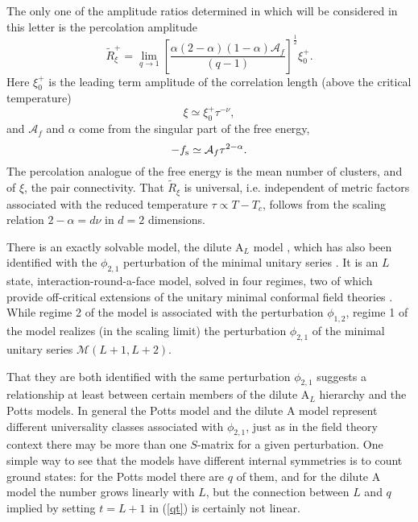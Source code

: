 \documentclass[a4paper,a4paper]{article}
\begin{document}
The only one of the amplitude ratios determined in \cite{dc}
which will be considered in this letter is the percolation
amplitude \cite{PHA, dc}
\begin{equation}
\tilde{R}_{\xi}^{+}=
\lim_{q\to 1}\left[\frac{\alpha(2-\alpha)(1-\alpha) \mathcal{A}_f}{(q-1)}
\right]^{\frac{1}{2}}\xi_{0}^{+}. \label{Imp}
\end{equation}
Here 
$\xi_0^{+}$ is the leading term amplitude of the correlation length
(above the critical temperature)
\begin{equation*}
\xi \simeq \xi_0^{+} \tau^{-\nu},
\end{equation*}
and $\mathcal{A}_f$ and $\alpha$ come from the singular 
part of the free energy, 
\begin{equation*}
-f_{\rm s} \simeq {\mathcal
A}_f \tau^{2-\alpha}.
\end{equation*}
The percolation analogue of the free energy is the mean number of clusters, 
and of
$\xi$, the pair connectivity.
That $\tilde{R}_{\xi}$ is universal, i.e. independent of metric factors 
associated
with the reduced temperature $\tau \propto T-T_c$,  follows
from the scaling relation $2-\alpha =d \nu$ in $d=2$ dimensions. 


There is an exactly solvable model, the dilute A$_L$ model
\cite{WNS}, which has also been identified with the
$\phi_{2,1}$ perturbation of the minimal unitary series \cite{WPSN}.
It is an $L$ state, 
interaction-round-a-face model, solved in four regimes,
two of which provide off-critical extensions of the unitary minimal conformal
field theories \cite{WPSN}.  While regime 2 of the model is associated with
the perturbation $\phi_{1,2}$, regime 1 of the model realizes
(in the scaling limit) the perturbation $\phi_{2,1}$ of the minimal
unitary series $\mathcal{M}(L+1,L+2)$.


That they are both identified with the same perturbation $\phi_{2,1}$ 
suggests a relationship at least
between certain members of the dilute A$_L$ hierarchy and the Potts models. 
In general the Potts model and the dilute A model represent 
different universality classes associated with $\phi_{2,1}$, just
as in the field theory context there may be more than one $S$-matrix 
for a given perturbation. 
One simple way to see that the models have different internal 
symmetries is to count ground states: for the Potts
model there are $q$ of them, and for the dilute A model the number
grows linearly with $L$, but the connection between $L$ and $q$
implied by setting $t=L+1$ in (\ref{qt}) is certainly not linear.
\end{document}

